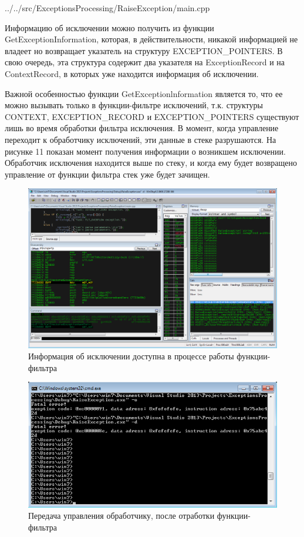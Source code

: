 \documentclass[a4paper, 12pt]{report}		%
\begin{document}

{../../src/ExceptionsProcessing/RaiseException/main.cpp}

Информацию об исключении можно получить из функции GetExceptionInformation, которая, в действительности, никакой информацией не владеет но возвращает указатель на структуру EXCEPTION\_POINTERS. В свою очередь, эта структура содержит два указателя на ExceptionRecord и на ContextRecord, в которых уже находится информация об исключении.

Важной особенностью функции GetExceptionlnformation является то, что ее можно вызывать только в функции-фильтре исключений, т.к. структуры CONTEXT, EXCEPTION\_RECORD и EXCEPTION\_POINTERS существуют лишь во время обработки фильтра исключения. В момент, когда управление переходит к обработчику исключений, эти данные в стеке разрушаются. На рисунке 11 показан момент получения информации о возникшем исключении. Обработчик исключения находится выше по стеку, и когда ему будет возвращено управление от функции фильтра стек уже будет зачищен.

\begin{figure}[h!]
\centering
\includegraphics[scale=0.5]{res/005}
\caption{Информация об исключении доступна в процессе работы функции-фильтра}
\end{figure}

\newpage

\begin{figure}[h!]
\centering
\includegraphics[scale=0.95]{res/004}
\caption{Передача управления обработчику, после отработки функции-фильтра}
\end{figure}
\end{document}
